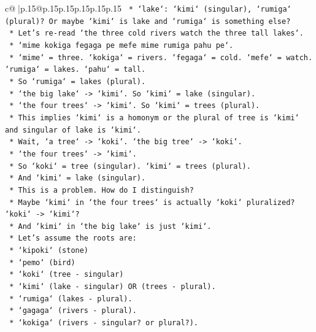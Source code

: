 \documentclass{article}
\begin{document}
{\begin{supertabular}{c@{$\;$}|p{.15\linewidth}@{}p{.15\linewidth}p{.15\linewidth}p{.15\linewidth}p{.15\linewidth}p{.15\linewidth}}
{{{\texttt{        *   `lake`: `kimi` (singular), `rumiga` (plural)? Or maybe `kimi` is lake and `rumiga` is something else?} \\
\texttt{        *   Let's re{-}read `the three cold rivers watch the three tall lakes`.} \\
\texttt{        *   `mime kokiga fegaga pe mefe mime rumiga pahu pe`.} \\
\texttt{        *   `mime` = three. `kokiga` = rivers. `fegaga` = cold. `mefe` = watch. `rumiga` = lakes. `pahu` = tall.} \\
\texttt{        *   So `rumiga` = lakes (plural).} \\
\texttt{        *   `the big lake` {-}> `kimi`. So `kimi` = lake (singular).} \\
\texttt{        *   `the four trees` {-}> `kimi`. So `kimi` = trees (plural).} \\
\texttt{        *   This implies `kimi` is a homonym or the plural of tree is `kimi` and singular of lake is `kimi`.} \\
\texttt{        *   Wait, `a tree` {-}> `koki`. `the big tree` {-}> `koki`.} \\
\texttt{        *   `the four trees` {-}> `kimi`.} \\
\texttt{        *   So `koki` = tree (singular). `kimi` = trees (plural).} \\
\texttt{        *   And `kimi` = lake (singular).} \\
\texttt{        *   This is a problem. How do I distinguish?} \\
\texttt{        *   Maybe `kimi` in `the four trees` is actually `koki` pluralized? `koki` {-}> `kimi`?} \\
\texttt{        *   And `kimi` in `the big lake` is just `kimi`.} \\
\texttt{        *   Let's assume the roots are:} \\
\texttt{            *   `kipoki` (stone)} \\
\texttt{            *   `pemo` (bird)} \\
\texttt{            *   `koki` (tree {-} singular)} \\
\texttt{            *   `kimi` (lake {-} singular) OR (trees {-} plural).} \\
\texttt{            *   `rumiga` (lakes {-} plural).} \\
\texttt{            *   `gagaga` (rivers {-} plural).} \\
\texttt{            *   `kokiga` (rivers {-} singular? or plural?).} \\
}}}
\end{supertabular}}
\end{document}
